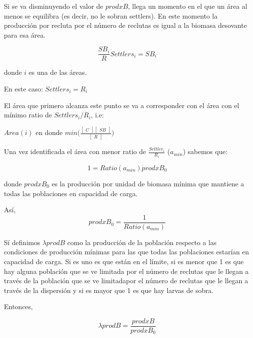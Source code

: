 \documentclass[12pt, oneside, a4paper]{article}
\begin{document}
Si se va disminuyendo el valor de $prodxB$, llega un momento en el que un área al menos se equilibra (es decir, no le sobran settlers). En este momento la producción por recluta por el número de reclutas es igual a la biomasa desovante para esa área. 

\begin{equation}
   \frac{SB_{i}}{R} \dot Settlers_{i} = SB_{i}
\end{equation}

donde $i$ es una de las áreas. 

En este caso: $ Settlers_{i}= R_{i}$

El área que primero alcanza este punto se va a corresponder con el área con el mínimo ratio de $Settlers_{i}/R_{i}$, i.e: 

$Area(i)$ en donde $min \Bigg ( \frac{\begin{bmatrix} C \end{bmatrix}\begin{bmatrix} SB \end{bmatrix}}{\begin{bmatrix} R \end{bmatrix}} \Bigg ) $

Una vez identificada el área con menor ratio de $\frac{Settler_{i}}{R_{i}}$ ($a_{min}$) sabemos que: 

\begin{equation}
        1= Ratio(a_{min}) \dot prodxB_{0}
\end{equation}

donde $prodxB_{0}$ es la producción por unidad de biomasa mínima que mantiene a todas las poblaciones en capacidad de carga. 

Así, 
\begin{equation}
        prodxB_{0} = \frac{1}{Ratio(a_{min})}
\end{equation}
			
Sí definimos $\lambda prod B$ como la producción de la población respecto a las condiciones de producción mínimas para las que todas las poblaciones estarían en capacidad de carga. Si es uno es que están en el límite, si es menor que 1 es que hay alguna población que se ve limitada por el número de reclutas que le llegan a través de la población que se ve limitadapor el número de reclutas que le llegan a través de la dispersión y si es mayor que 1 es que hay larvas de sobra.

Entonces, 

\begin{equation}
        \lambda prod B = \frac{prodxB}{prodxB_{0}}
\end{equation}
\end{document}
